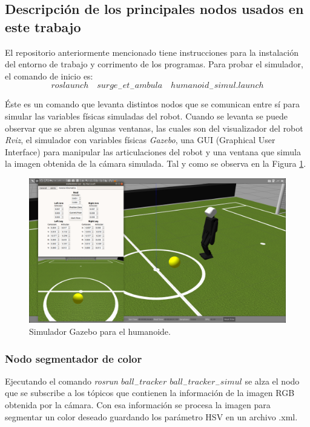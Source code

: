 		\subsection*{Descripción de los principales nodos usados en este trabajo}
		El repositorio anteriormente mencionado tiene instrucciones para la instalación del entorno de trabajo y corrimento de los programas. Para probar el simulador, el comando de inicio es: $$roslaunch \quad surge_-et_-ambula \quad humanoid_-simul.launch$$ 

		Éste es un comando que levanta distintos nodos que se comunican entre sí para simular las variables físicas simuladas del robot. Cuando se levanta se puede observar que se abren algunas ventanas, las cuales son del visualizador del robot \textit{Rviz}, el simulador con variables físicas \textit{Gazebo}, una GUI (Graphical User Interface) para manipular las articulaciones del robot y una ventana que simula la imagen obtenida de la cámara simulada. Tal y como se observa en la Figura \ref{fig:gazebo}.
		
\begin{figure}
	\centering
	\includegraphics[scale=0.2]{images/gazebo.png}
	\caption{Simulador Gazebo para el humanoide.}
	\label{fig:gazebo}
\end{figure} 
		
			\subsubsection*{Nodo segmentador de color}
			Ejecutando el comando \textit{rosrun $ball_-tracker$ $ball_-tracker_-simul$} se alza el nodo que se subscribe a los tópicos que contienen la información de la imagen RGB obtenida por la cámara. Con esa información se procesa la imagen para segmentar un color deseado guardando los parámetro HSV en un archivo .xml.
			
